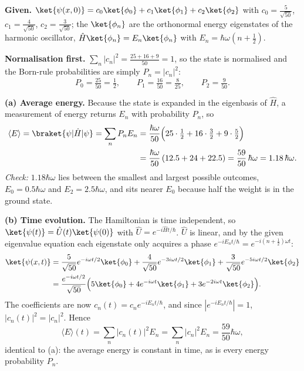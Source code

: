 \begin{solutionbox}
\textbf{Given.} $\ket{\psi(x,0)}=c_0\ket{\phi_0}+c_1\ket{\phi_1}+c_2\ket{\phi_2}$ with $c_0=\frac{5}{\sqrt{50}}$, $c_1=\frac{4}{\sqrt{50}}$, $c_2=\frac{3}{\sqrt{50}}$; the $\ket{\phi_n}$ are the orthonormal energy eigenstates of the harmonic oscillator, $\hat H\ket{\phi_n}=E_n\ket{\phi_n}$ with $E_n=\hbar\omega(n+\tfrac12)$.

\textbf{Normalisation first.} $\sum_n|c_n|^2=\frac{25+16+9}{50}=1$, so the state is normalised and the Born-rule probabilities are simply $P_n=|c_n|^2$:
\[
P_0=\tfrac{25}{50}=\tfrac12,\qquad P_1=\tfrac{16}{50}=\tfrac{8}{25},\qquad P_2=\tfrac{9}{50}.
\]

\textbf{(a) Average energy.} Because the state is expanded in the eigenbasis of $\hat H$, a measurement of energy returns $E_n$ with probability $P_n$, so
\begin{align*}
\langle E\rangle=\braket{\psi|\hat H|\psi}=\sum_nP_nE_n
&=\frac{\hbar\omega}{50}\Big(25\cdot\tfrac12+16\cdot\tfrac32+9\cdot\tfrac52\Big)\\
&=\frac{\hbar\omega}{50}\,(12.5+24+22.5)=\frac{59}{50}\,\hbar\omega=1.18\,\hbar\omega .
\end{align*}
\emph{Check:} $1.18\hbar\omega$ lies between the smallest and largest possible outcomes, $E_0=0.5\hbar\omega$ and $E_2=2.5\hbar\omega$, and sits nearer $E_0$ because half the weight is in the ground state.

\textbf{(b) Time evolution.} The Hamiltonian is time independent, so $\ket{\psi(t)}=\hat U(t)\ket{\psi(0)}$ with $\hat U=e^{-i\hat Ht/\hbar}$. $\hat U$ is linear, and by the given eigenvalue equation each eigenstate only acquires a phase $e^{-iE_nt/\hbar}=e^{-i(n+\frac12)\omega t}$:
\begin{align*}
\ket{\psi(x,t)}
&=\frac{5}{\sqrt{50}}e^{-i\omega t/2}\ket{\phi_0}+\frac{4}{\sqrt{50}}e^{-3i\omega t/2}\ket{\phi_1}+\frac{3}{\sqrt{50}}e^{-5i\omega t/2}\ket{\phi_2}\\
&=\frac{e^{-i\omega t/2}}{\sqrt{50}}\Big(5\ket{\phi_0}+4e^{-i\omega t}\ket{\phi_1}+3e^{-2i\omega t}\ket{\phi_2}\Big).
\end{align*}
The coefficients are now $c_n(t)=c_ne^{-iE_nt/\hbar}$, and since $|e^{-iE_nt/\hbar}|=1$, $|c_n(t)|^2=|c_n|^2$. Hence
\[
\langle E\rangle(t)=\sum_n|c_n(t)|^2E_n=\sum_n|c_n|^2E_n=\frac{59}{50}\hbar\omega,
\]
identical to (a): the average energy is constant in time, as is every energy probability $P_n$.


\end{solutionbox}

